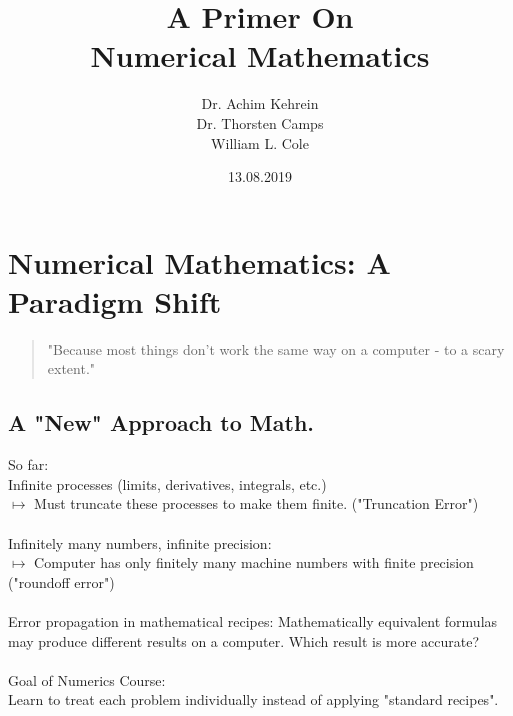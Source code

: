 \documentclass[a4paper,12pt]{report}
\begin{document}
\title{\Large{\textbf{A Primer On \\Numerical Mathematics}}}
	\author{Dr. Achim Kehrein \\ Dr. Thorsten Camps\\William L. Cole}
	\date{13.08.2019}

	\maketitle
	\tableofcontents

	\setcounter{page}{2}

	\fancyhf{}

\renewcommand{\headrulewidth}{2pt}
\renewcommand{\footrulewidth}{2pt}

\fancyhead[LE]{\leftmark}
	\fancyhead[RO]{\nouppercase{\rightmark}}
	\fancyfoot[LE,RO]{\thepage}

	\renewcommand{\thefootnote}{\fnsymbol{footnote}}

\setcounter{chapter}{-1}
\chapter{Numerical Mathematics: A Paradigm Shift}

\begin{quote}
	"Because most things don't work the same way on a computer - to a scary extent."\\
\end{quote}

\section{A "New" Approach to Math.}


	So far:\\
	Infinite processes (limits, derivatives, integrals, etc.)\\
	$\longmapsto$ Must truncate these processes to make them finite. ("Truncation Error")\\
\\
	Infinitely many numbers, infinite precision:\\
	$\longmapsto$ Computer has only finitely many machine numbers with finite precision ("roundoff 
	error")\\
\\
	Error propagation in mathematical recipes: Mathematically equivalent formulas may produce 
	different results on a computer. Which result is
	more accurate?\\
\\
	Goal of Numerics Course:\\
	Learn to treat each problem individually instead of applying "standard recipes".\\
\end{document}
